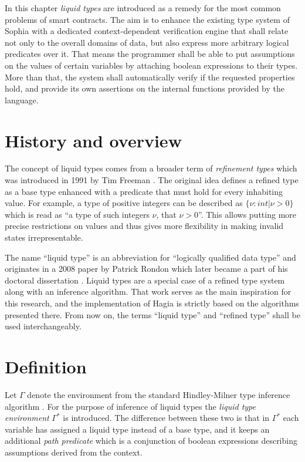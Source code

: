 In this chapter \emph{liquid types} are introduced as a remedy for the most
common problems of smart contracts. The aim is to enhance the existing type
system of Sophia with a dedicated context-dependent verification engine that
shall relate not only to the overall domains of data, but also express more
arbitrary logical predicates over it. That means the programmer shall be able to
put assumptions on the values of certain variables by attaching boolean expressions
to their types. More than that, the system shall automatically verify if the
requested properties hold, and provide its own assertions on the internal
functions provided by the language.

\section{History and overview}

The concept of liquid types comes from a broader term of \emph{refinement types}
which was introduced in 1991 by Tim Freeman \cite{Freeman91refinementtypes}. The
original idea defines a refined type as a base type enhanced with a predicate
that must hold for every inhabiting value. For example, a type of positive
integers can be described as $\{\nu : int | \nu > 0\}$ which is read as ``a type
of such integers $\nu$, that $\nu > 0$''. This allows putting more precise
restrictions on values and thus gives more flexibility in making invalid states
irrepresentable.

The name ``liquid type'' is an abbreviation for ``logically qualified data
type'' and originates in a 2008 paper by Patrick Rondon \cite{liquid} which
later became a part of his doctoral dissertation \cite{liquid_phd}. Liquid types
are a special case of a refined type system along with an inference algorithm.
That work serves as the main inspiration for this research, and the
implementation of Hagia is strictly based on the algorithms presented there.
From now on, the terms ``liquid type'' and ``refined type'' shall be used
interchangeably.

\section{Definition}
\label{liquid_types_definition}

Let $\Gamma$ denote the environment from the standard Hindley-Milner type
inference algorithm \cite{hindley, milner}. For the purpose of inference of
liquid types the \emph{liquid type environment} $\Gamma^*$ is introduced. The
difference between these two is that in $\Gamma^*$ each variable has assigned a
liquid type instead of a base type, and it keeps an additional \emph{path
  predicate} which is a conjunction of boolean expressions describing
assumptions derived from the context.

